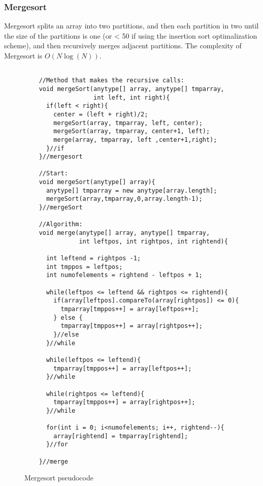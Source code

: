 \documentclass[paper=a4, fontsize=11pt]{scrartcl}
\numberwithin{equation}{section} %
\numberwithin{figure}{section} %
\numberwithin{table}{section} %
\theoremstyle{definition}
\begin{document}
\subsubsection{Mergesort}
Mergesort splits an array into two partitions, and then each partition in two until the size of the partitions is one (or < 50 if using 
the insertion sort optimalization scheme), and then recursively merges adjacent partitions.
The complexity of Mergesort is $O(N\log(N))$.

\begin{figure}[p]
  \begin{verbatim}

    //Method that makes the recursive calls:
    void mergeSort(anytype[] array, anytype[] tmparray, 
                   int left, int right){
      if(left < right){
        center = (left + right)/2;
        mergeSort(array, tmparray, left, center);
        mergeSort(array, tmparray, center+1, left);
        merge(array, tmparray, left ,center+1,right);
      }//if 
    }//mergesort

    //Start: 
    void mergeSort(anytype[] array){
      anytype[] tmparray = new anytype[array.length];
      mergeSort(array,tmparray,0,array.length-1);
    }//mergeSort

    //Algorithm:
    void merge(anytype[] array, anytype[] tmparray, 
               int leftpos, int rightpos, int rightend){

      int leftend = rightpos -1;
      int tmppos = leftpos;
      int numofelements = rightend - leftpos + 1;

      while(leftpos <= leftend && rightpos <= rightend){
        if(array[leftpos].compareTo(array[rightpos]) <= 0){
          tmparray[tmppos++] = array[leftpos++];
        } else {
          tmparray[tmppos++] = array[rightpos++];
        }//else
      }//while

      while(leftpos <= leftend){
        tmparray[tmppos++] = array[leftpos++];
      }//while

      while(rightpos <= leftend){
        tmparray[tmppos++] = array[rightpos++];
      }//while
      
      for(int i = 0; i<numofelements; i++, rightend--){
        array[rightend] = tmparray[rightend];
      }//for

    }//merge

  \end{verbatim}
  \caption{Mergesort pseudocode}
\end{figure}
\end{document}
